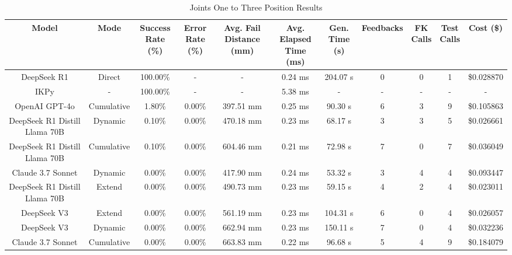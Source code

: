 \begin{landscape}
\begin{table}[H]
\tiny
\renewcommand{\arraystretch}{1.2}
\caption{Joints One to Three Position Results}
\begin{center}
\begin{tabular}{|c|c|c|c|c|c|c|c|c|c|c|}
    \hline
    \textbf{Model} & 
    \textbf{Mode} & 
    \makecell{\textbf{Success}\\\textbf{Rate (\%)}} &
    \makecell{\textbf{Error}\\\textbf{Rate (\%)}} &
    \makecell{\textbf{Avg. Fail}\\\textbf{Distance (mm)}} &
    \makecell{\textbf{Avg. Elapsed}\\\textbf{Time (ms)}} &
    \makecell{\textbf{Gen.}\\\textbf{Time (s)}} &
    \textbf{Feedbacks} &
    \makecell{\textbf{FK}\\\textbf{Calls}} &
    \makecell{\textbf{Test}\\\textbf{Calls}} &
    \textbf{Cost (\$)} \\
    \hline
    DeepSeek R1 & Direct & 100.00\% & - & - & 0.24 ms & 204.07 s & 0 & 0 & 1 & \$0.028870 \\
    \hline
    IKPy & - & 100.00\% & - & - & 5.38 ms & - & - & - & - & - \\
    \hline
    OpenAI GPT-4o & Cumulative & 1.80\% & 0.00\% & 397.51 mm & 0.25 ms & 90.30 s & 6 & 3 & 9 & \$0.105863 \\
    \hline
    DeepSeek R1 Distill Llama 70B & Dynamic & 0.10\% & 0.00\% & 470.18 mm & 0.23 ms & 68.17 s & 3 & 3 & 5 & \$0.026661 \\
    \hline
    DeepSeek R1 Distill Llama 70B & Cumulative & 0.10\% & 0.00\% & 604.46 mm & 0.21 ms & 72.98 s & 7 & 0 & 7 & \$0.036049 \\
    \hline
    Claude 3.7 Sonnet & Dynamic & 0.00\% & 0.00\% & 417.90 mm & 0.24 ms & 53.32 s & 3 & 4 & 4 & \$0.093447 \\
    \hline
    DeepSeek R1 Distill Llama 70B & Extend & 0.00\% & 0.00\% & 490.73 mm & 0.23 ms & 59.15 s & 4 & 2 & 4 & \$0.023011 \\
    \hline
    DeepSeek V3 & Extend & 0.00\% & 0.00\% & 561.19 mm & 0.23 ms & 104.31 s & 6 & 0 & 4 & \$0.026057 \\
    \hline
    DeepSeek V3 & Dynamic & 0.00\% & 0.00\% & 662.94 mm & 0.23 ms & 150.11 s & 7 & 0 & 4 & \$0.032236 \\
    \hline
    Claude 3.7 Sonnet & Cumulative & 0.00\% & 0.00\% & 663.83 mm & 0.22 ms & 96.68 s & 5 & 4 & 9 & \$0.184079 \\

\end{tabular}
\end{center}
\end{table}
\end{landscape}
